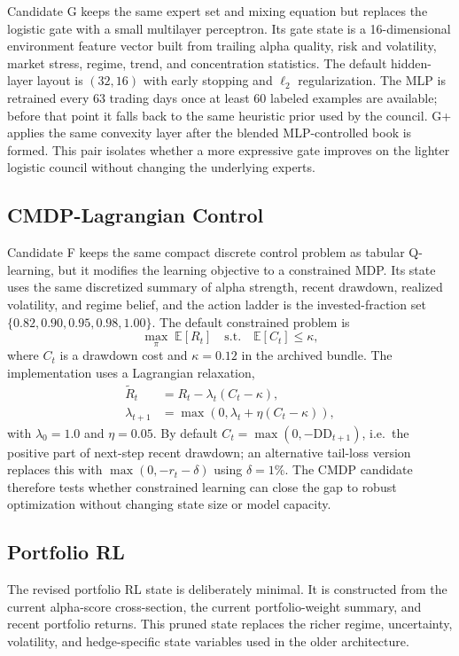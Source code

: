 \documentclass[11pt]{article}
\begin{document}
Candidate G keeps the same expert set and mixing equation but replaces the
logistic gate with a small multilayer perceptron. Its gate state is a
16-dimensional environment feature vector built from trailing alpha quality,
risk and volatility, market stress, regime, trend, and concentration
statistics. The default hidden-layer layout is $(32,16)$ with early stopping
and $\ell_2$ regularization. The MLP is retrained every 63 trading days once
at least 60 labeled examples are available; before that point it falls back to
the same heuristic prior used by the council. G+ applies the same convexity
layer after the blended MLP-controlled book is formed. This pair isolates
whether a more expressive gate improves on the lighter logistic council
without changing the underlying experts.

\subsection{CMDP-Lagrangian Control}

Candidate F keeps the same compact discrete control problem as tabular
Q-learning, but it modifies the learning objective to a constrained MDP. Its
state uses the same discretized summary of alpha strength, recent drawdown,
realized volatility, and regime belief, and the action ladder is the
invested-fraction set $\{0.82, 0.90, 0.95, 0.98, 1.00\}$. The default
constrained problem is
\[
\max_{\pi}\; \mathbb{E}[R_t]
\quad \text{s.t.} \quad
\mathbb{E}[C_t] \le \kappa,
\]
where $C_t$ is a drawdown cost and $\kappa=0.12$ in the archived bundle. The
implementation uses a Lagrangian relaxation,
\begin{align*}
\tilde R_t &= R_t - \lambda_t(C_t-\kappa), \\
\lambda_{t+1} &= \max(0,\lambda_t + \eta(C_t-\kappa)),
\end{align*}
with $\lambda_0=1.0$ and $\eta=0.05$. By default
$C_t = \max(0,-\mathrm{DD}_{t+1})$, i.e.\ the positive part of next-step recent
drawdown; an alternative tail-loss version replaces this with
$\max(0,-r_t-\delta)$ using $\delta=1\%$. The CMDP candidate therefore tests
whether constrained learning can close the gap to robust optimization without
changing state size or model capacity.

\subsection{Portfolio RL}

The revised portfolio RL state is deliberately minimal. It is constructed from
the current alpha-score cross-section, the current portfolio-weight summary, and
recent portfolio returns. This pruned state replaces the richer regime,
uncertainty, volatility, and hedge-specific state variables used in the older
architecture.
\end{document}
